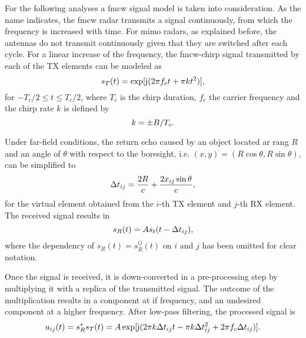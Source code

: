 For the following analyses a \Ac{fmcw} signal model is taken into consideration. As the name indicates, the \ac{fmcw} radar transmits a signal continuously, from which the frequency is increased with time. For \Ac{mimo} radars, as explained before, the antennas do not transmit continuously given that they are switched after each cycle. For a linear increase of the frequency, the \Ac{fmcw}-chirp signal transmitted by each of the TX elements can be modeled as 
\begin{equation}
	s_T(t) = \exp[\mathrm{j}(2\pi f_ct+\pi kt^2)]\\,
\end{equation}
for $-T_c/2 \leq t \leq T_c/2$, where $T_c$ is the chirp duration, $f_c$ the carrier frequency and the chirp rate $k$ is defined by
\begin{equation}
	k = \pm B/T_c\\.
\end{equation}

Under far-field conditions, the return echo caused by an object located ar rang $R$ and an angle of $\theta$ with respect to the boresight, i.e. $(x,y) = (R\cos\theta,R\sin\theta)$, can be simplified to
\begin{equation}
	\Delta t_{ij} = \frac{2R}{c} + \frac{2x_{ij}\sin\theta}{c}\\,
\end{equation}
for the virtual element obtained from the $i$-th TX element and $j$-th RX element. The received signal results in 
\begin{equation}
	s_R(t) = As_t(t-\Delta t_{ij})\\,
\end{equation}
where the dependency of $s_R(t) = s_R^{ij}(t) $ on $i$ and $j$ has been omitted for clear notation. 

Once the signal is received, it is down-converted in a pre-processing step by multiplying it with a replica of the transmitted signal. The outcome of the multiplication results in a component at \ac{if} frequency, and an undesired component at a higher frequency. After low-pass filtering, the processed signal is
\begin{equation}
	u_{ij}(t) = s_R^{*}s_T(t) = A\exp[\mathrm{j}(2\pi k \Delta t_{ij}t-\pi k\Delta  t_{ij}^2 + 2\pi f_c \Delta t_{ij})]\\.
\end{equation}


